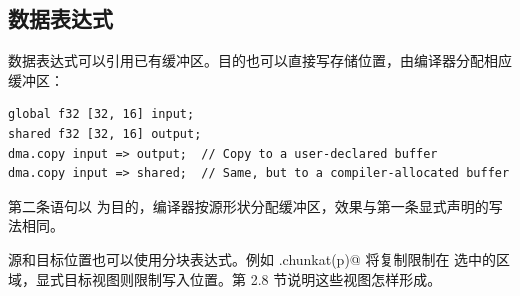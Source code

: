 \subsection*{数据表达式}

数据表达式可以引用已有缓冲区。目的也可以直接写存储位置，由编译器分配相应缓冲区：

\begin{lstlisting}[language=croqtile,caption={数据表达式}]
global f32 [32, 16] input;
shared f32 [32, 16] output;
dma.copy input => output;  // Copy to a user-declared buffer
dma.copy input => shared;  // Same, but to a compiler-allocated buffer
\end{lstlisting}

第二条语句以 \co@shared@ 为目的，编译器按源形状分配缓冲区，效果与第一条显式声明的写法相同。

源和目标位置也可以使用分块表达式。例如 \co@input.chunkat(p)@ 将复制限制在 \co@p@ 选中的区域，显式目标视图则限制写入位置。第 2.8 节说明这些视图怎样形成。
